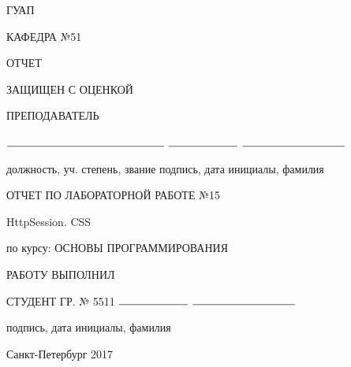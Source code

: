 \documentclass{article}
\begin{document}
    \begin{titlepage}
        \begin{center}
            ГУАП
            \vspace{0.25cm}

            КАФЕДРА №51
        \end{center}

        \begin{flushleft}

            ОТЧЕТ

            ЗАЩИЩЕН С ОЦЕНКОЙ

            ПРЕПОДАВАТЕЛЬ


            \vspace{0.5cm}

            $\rule{5cm}{0.15mm}$ \hfill $\rule{2.2cm}{0.15mm}$  \hfill $\rule{3.25cm}{0.15mm}$

            должность, уч. степень, звание \hfill подпись, дата \hfill инициалы, фамилия
        \end{flushleft}


        \hspace{2cm}

        \begin{center}
            ОТЧЕТ ПО ЛАБОРАТОРНОЙ РАБОТЕ №15


            \vspace{1cm}

            HttpSession. CSS


            \vspace{1cm}

            по курсу: ОСНОВЫ ПРОГРАММИРОВАНИЯ {\MakeUppercase{}}
        \end{center}

        \vspace{3cm}

        \begin{flushleft}
            РАБОТУ ВЫПОЛНИЛ

            СТУДЕНТ ГР. № 5511 \hfill $\rule{2.2cm}{0.15mm}$  \hfill $\rule{3.25cm}{0.15mm}$

            \hspace{7.8cm} подпись, дата \hfill инициалы, фамилия
        \end{flushleft}

        \vspace{5cm}
        \begin{center}
            Санкт-Петербург 2017
        \end{center}
    \end{titlepage}
\end{document}
